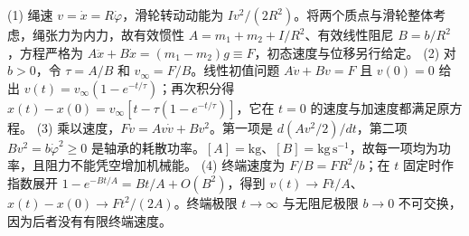 (1) 绳速 \(v=\dot x=R\dot\varphi\)，滑轮转动动能为 \(Iv^2/(2R^2)\)。将两个质点与滑轮整体考虑，绳张力为内力，故有效惯性 \(A=m_1+m_2+I/R^2\)、有效线性阻尼 \(B=b/R^2\)，方程严格为 \(A\ddot x+B\dot x=(m_1-m_2)g\equiv F\)，初态速度与位移另行给定。
(2) 对 \(b>0\)，令 \(\tau=A/B\) 和 \(v_\infty=F/B\)。线性初值问题 \(A\dot v+Bv=F\) 且 \(v(0)=0\) 给出 \(v(t)=v_\infty(1-e^{-t/\tau})\)；再次积分得 \(x(t)-x(0)=v_\infty[t-\tau(1-e^{-t/\tau})]\)，它在 \(t=0\) 的速度与加速度都满足原方程。
(3) 乘以速度，\(Fv=Av\dot v+Bv^2\)。第一项是 \(d(Av^2/2)/dt\)，第二项 \(Bv^2=b\dot\varphi^2\ge0\) 是轴承的耗散功率。\([A]=\mathrm{kg}\)、\([B]=\mathrm{kg\,s^{-1}}\)，故每一项均为功率，且阻力不能凭空增加机械能。
(4) 终端速度为 \(F/B=FR^2/b\)；在 \(t\) 固定时作指数展开 \(1-e^{-Bt/A}=Bt/A+O(B^2)\)，得到 \(v(t)\to Ft/A\)、\(x(t)-x(0)\to Ft^2/(2A)\)。终端极限 \(t\to\infty\) 与无阻尼极限 \(b\to0\) 不可交换，因为后者没有有限终端速度。

